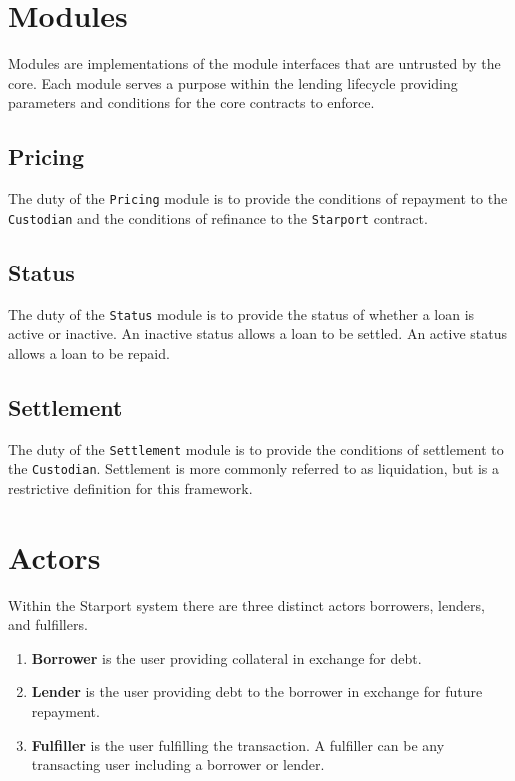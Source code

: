 \documentclass[12pt]{article}
\begin{document}
\section{Modules}
Modules are implementations of the module interfaces that are untrusted by the core. Each module serves a purpose within the lending lifecycle providing parameters and conditions for the core contracts to enforce.
\subsection{Pricing}
The duty of the \texttt{Pricing} module is to provide the conditions of repayment to the \texttt{Custodian} and the conditions of refinance to the \texttt{Starport} contract.
\subsection{Status}
The duty of the \texttt{Status} module is to provide the status of whether a loan is active or inactive. An inactive status allows a loan to be settled. An active status allows a loan to be repaid.
\subsection{Settlement}
The duty of the \texttt{Settlement} module is to provide the conditions of settlement to the \texttt{Custodian}. Settlement is more commonly referred to as liquidation, but is a restrictive definition for this framework.
\section{Actors}
Within the Starport system there are three distinct actors borrowers, lenders, and fulfillers.

\begin{enumerate}
	\item \textbf{Borrower} is the user providing collateral in exchange for debt.
	\item \textbf{Lender} is the user providing debt to the borrower in exchange for future repayment.
	\item \textbf{Fulfiller} is the user fulfilling the transaction. A fulfiller can be any transacting user including a borrower or lender.
\end{enumerate}
\end{document}

